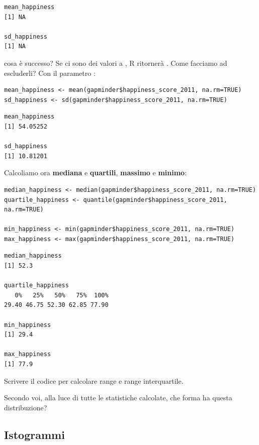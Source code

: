 \begin{lstlisting}[style=Rstyle]
mean_happiness
[1] NA

sd_happiness
[1] NA
\end{lstlisting}
%
cosa \`e successo? Se ci sono dei valori a , R ritorner\`a . Come facciamo ad escluderli? Con il parametro :

\begin{lstlisting}[style=Rstylescript]
mean_happiness <- mean(gapminder$happiness_score_2011, na.rm=TRUE)
sd_happiness <- sd(gapminder$happiness_score_2011, na.rm=TRUE)
\end{lstlisting}

\begin{lstlisting}[style=Rstyle]
mean_happiness
[1] 54.05252

sd_happiness
[1] 10.81201
\end{lstlisting}
%
Calcoliamo ora \textbf{mediana} e \textbf{quartili}, \textbf{massimo} e \textbf{minimo}:

\begin{lstlisting}[style=Rstylescript]
median_happiness <- median(gapminder$happiness_score_2011, na.rm=TRUE)
quartile_happiness <- quantile(gapminder$happiness_score_2011, na.rm=TRUE)

min_happiness <- min(gapminder$happiness_score_2011, na.rm=TRUE)
max_happiness <- max(gapminder$happiness_score_2011, na.rm=TRUE)
\end{lstlisting}

\begin{lstlisting}[style=Rstyle]
median_happiness
[1] 52.3

quartile_happiness
   0%   25%   50%   75%  100%
29.40 46.75 52.30 62.85 77.90

min_happiness
[1] 29.4

max_happiness
[1] 77.9
\end{lstlisting}


\vspace{0.5cm} 

\begin{exercise}\label{ex4.3}
	
\noindent Scrivere il codice per calcolare range e range interquartile.

\noindent Secondo voi, alla luce di tutte le statistiche calcolate, che forma ha questa distribuzione?

\end{exercise}

\subsection{Istogrammi}
\label{sec:histo}

